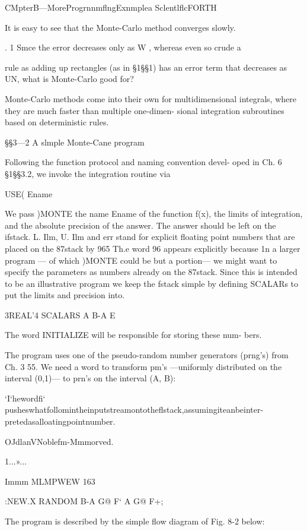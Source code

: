 CMpterB—MoreProgrnnmﬂngExnmplea SclentlﬂcFORTH

It is easy to see that the Monte-Carlo method converges slowly.

. 1
Smce the error decreases only as W , whereas even so crude a

rule as adding up rectangles (as in §1§§1) has an error term that
decreases as UN, what is Monte-Carlo good for?

Monte-Carlo methods come into their own for multidimensional
integrals, where they are much faster than multiple one-dimen-
sional integration subroutines based on deterministic rules.

§§3—2 A slmple Monte-Cane program

Following the function protocol and naming convention devel-
oped in Ch. 6 §1§§3.2, we invoke the integration routine via

USE( Ename %

We pass )MONTE the name Ename of the function f(x), the
limits of integration, and the absolute precision of the answer.
The answer should be left on the ifstack. L. Ilm, U. Ilm and err
stand for explicit ﬂoating point numbers that are placed on the
87stack by 965 Th.e word 96 appears explicitly because 1n a larger
program — of which )MONTE could be but a portion— we might
want to specify the parameters as numbers already on the 87stack.
Since this is intended to be an illustrative program we keep the
fstack simple by defining SCALARs to put the limits and
precision into.

3REAL'4 SCALARS A B-A E

The word INITIALIZE will be responsible for storing these num-
bers.

The program uses one of the pseudo-random number generators
(prng’s) from Ch. 3 55. We need a word to transform pm’s
—uniformly distributed on the interval (0,1)— to prn's on the
interval (A, B):

 

‘I‘hewordﬁ‘ pusheswhatfollomintheinputstreamontotheﬂstack,assumingiteanbeinter-
pretedasalloatingpointnumber.

OJdlanVNoblefm-Mmmorved.

1...»...

 

Immm MLMPWEW 163

:NEW.X RANDOM B-A G@ F‘ A G@ F+;

The program is described by the simple ﬂow diagram of Fig. 8-2
below:

